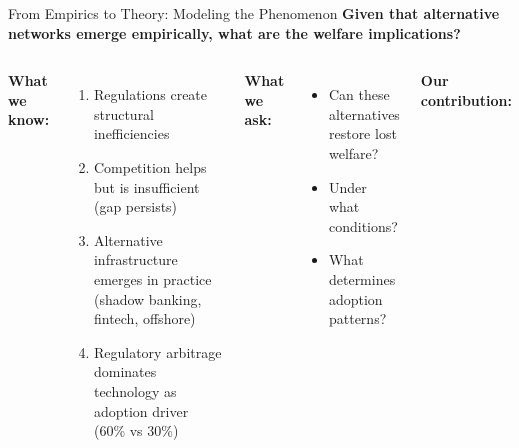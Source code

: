 \documentclass[aspectratio=169]{beamer}
\begin{document}
\begin{frame}{From Empirics to Theory: Modeling the Phenomenon}
    \textbf{Given that alternative networks emerge empirically, what are the welfare implications?}
    
    \vspace{0.3cm}
    \begin{columns}
        \textbf{What we know:}
        \begin{enumerate}
            \item Regulations create structural inefficiencies
            
            \item Competition helps but is insufficient (gap persists)
            
            \item Alternative infrastructure emerges in practice (shadow banking, fintech, offshore)
            
            \item Regulatory arbitrage dominates technology as adoption driver (60\% vs 30\%)
        \end{enumerate}
        
        \vspace{0.3cm}
        \textbf{What we ask:}
        \begin{itemize}
            \item Can these alternatives restore lost welfare?
            \item Under what conditions?
            \item What determines adoption patterns?
        \end{itemize}
        
        \centering
        \textbf{Our contribution:}
        
        \vspace{0.3cm}
\end{columns}
\end{frame}
\end{document}
